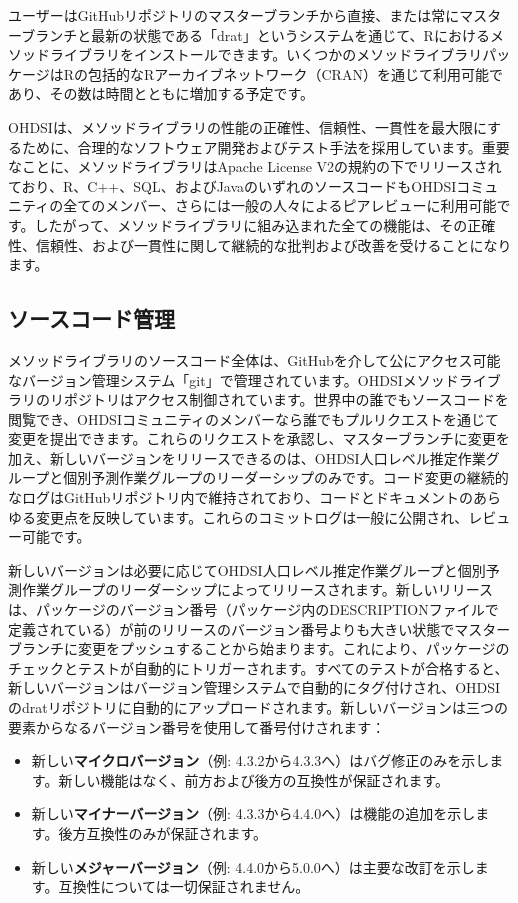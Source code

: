 \documentclass[
  11pt]{book}
\providecommand{\tightlist}{%
  \setlength{\itemsep}{0pt}\setlength{\parskip}{0pt}}
\theoremstyle{definition}
\theoremstyle{definition}
\theoremstyle{definition}
\theoremstyle{definition}
\theoremstyle{remark}
\begin{document}
ユーザーはGitHubリポジトリのマスターブランチから直接、または常にマスターブランチと最新の状態である「drat」というシステムを通じて、Rにおけるメソッドライブラリをインストールできます。いくつかのメソッドライブラリパッケージはRの包括的なRアーカイブネットワーク（CRAN）を通じて利用可能であり、その数は時間とともに増加する予定です。

OHDSIは、メソッドライブラリの性能の正確性、信頼性、一貫性を最大限にするために、合理的なソフトウェア開発およびテスト手法を採用しています。重要なことに、メソッドライブラリはApache License V2の規約の下でリリースされており、R、C++、SQL、およびJavaのいずれのソースコードもOHDSIコミュニティの全てのメンバー、さらには一般の人々によるピアレビューに利用可能です。したがって、メソッドライブラリに組み込まれた全ての機能は、その正確性、信頼性、および一貫性に関して継続的な批判および改善を受けることになります。

\subsection{ソースコード管理}\label{ux30bdux30fcux30b9ux30b3ux30fcux30c9ux7ba1ux7406}

メソッドライブラリのソースコード全体は、GitHubを介して公にアクセス可能なバージョン管理システム「git」で管理されています。OHDSIメソッドライブラリのリポジトリはアクセス制御されています。世界中の誰でもソースコードを閲覧でき、OHDSIコミュニティのメンバーなら誰でもプルリクエストを通じて変更を提出できます。これらのリクエストを承認し、マスターブランチに変更を加え、新しいバージョンをリリースできるのは、OHDSI人口レベル推定作業グループと個別予測作業グループのリーダーシップのみです。コード変更の継続的なログはGitHubリポジトリ内で維持されており、コードとドキュメントのあらゆる変更点を反映しています。これらのコミットログは一般に公開され、レビュー可能です。

新しいバージョンは必要に応じてOHDSI人口レベル推定作業グループと個別予測作業グループのリーダーシップによってリリースされます。新しいリリースは、パッケージのバージョン番号（パッケージ内のDESCRIPTIONファイルで定義されている）が前のリリースのバージョン番号よりも大きい状態でマスターブランチに変更をプッシュすることから始まります。これにより、パッケージのチェックとテストが自動的にトリガーされます。すべてのテストが合格すると、新しいバージョンはバージョン管理システムで自動的にタグ付けされ、OHDSIのdratリポジトリに自動的にアップロードされます。新しいバージョンは三つの要素からなるバージョン番号を使用して番号付けされます：

\begin{itemize}
\tightlist
\item
  新しい\textbf{マイクロバージョン}（例: 4.3.2から4.3.3へ）はバグ修正のみを示します。新しい機能はなく、前方および後方の互換性が保証されます。
\item
  新しい\textbf{マイナーバージョン}（例: 4.3.3から4.4.0へ）は機能の追加を示します。後方互換性のみが保証されます。
\item
  新しい\textbf{メジャーバージョン}（例: 4.4.0から5.0.0へ）は主要な改訂を示します。互換性については一切保証されません。
\end{itemize}
\end{document}
